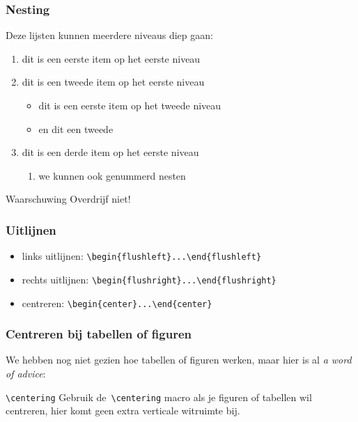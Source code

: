 \begin{frame}
  \frametitle{Nesting}

  Deze lijsten kunnen meerdere niveaus diep gaan:
  \begin{enumerate}
	\item dit is een eerste item op het eerste niveau
	\item dit is een tweede item op het eerste niveau
	  \begin{itemize}
		\item dit is een eerste item op het tweede niveau
		\item en dit een tweede
	  \end{itemize}
	\item dit is een derde item op het eerste niveau
	  \begin{enumerate}
		\item we kunnen ook genummerd nesten
	  \end{enumerate}
  \end{enumerate}

  \begin{alertblock}{Waarschuwing}
	Overdrijf niet!
  \end{alertblock}
\end{frame}


\begin{frame}
  \frametitle{Uitlijnen}

  \begin{itemize}
    \item links uitlijnen: \texttt{\textcolor{uagreen}{\textbackslash begin}\{flushleft\}...\textcolor{uagreen}{\textbackslash end}\{flushleft\}}
    \item rechts uitlijnen: \texttt{\textcolor{uagreen}{\textbackslash begin}\{flushright\}...\textcolor{uagreen}{\textbackslash end}\{flushright\}}
    \item centreren: \texttt{\textcolor{uagreen}{\textbackslash begin}\{center\}...\textcolor{uagreen}{\textbackslash end}\{center\}}
  \end{itemize}
\end{frame}

\begin{frame}[fragile]
  \frametitle{Centreren bij tabellen of figuren}

  We hebben nog niet gezien hoe tabellen of figuren werken, maar hier is al \emph{a word of advice}:
  \begin{exampleblock}{\texttt{\textbackslash centering}}
    Gebruik de~\texttt{\textcolor{uagreen}{\textbackslash centering}} macro als je figuren of tabellen wil centreren, hier komt geen extra verticale witruimte bij.
  \end{exampleblock}
\end{frame}

